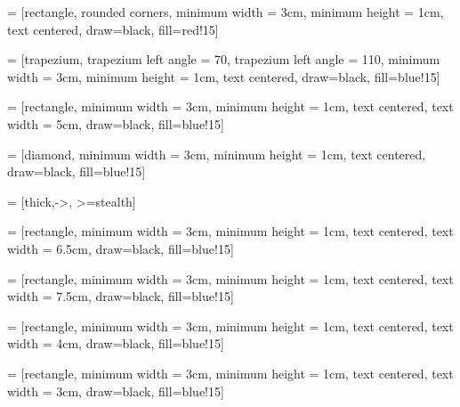 \RequirePackage{tikz}

 =
[rectangle, rounded corners, minimum width = 3cm, minimum height = 1cm,
text centered, draw=black, fill=red!15]

 = 
[trapezium, trapezium left angle = 70, trapezium left angle = 110, 
minimum width = 3cm, minimum height = 1cm, text centered, draw=black, 
fill=blue!15]

 =
[rectangle, minimum width = 3cm, minimum height = 1cm, text centered, 
text width = 5cm, draw=black, fill=blue!15]

 =
[diamond, minimum width = 3cm, minimum height = 1cm, text centered, draw=black,
fill=blue!15]

 = [thick,->, >=stealth]

 = 
[rectangle, minimum width = 3cm, minimum height = 1cm, text centered,
 text width = 6.5cm, draw=black, fill=blue!15]

 = [rectangle, minimum width = 3cm, minimum height = 1cm, 
text centered, text width = 7.5cm, draw=black, fill=blue!15]

 = [rectangle, minimum width = 3cm, minimum height = 1cm, 
text centered, text width = 4cm, draw=black, fill=blue!15]

 = [rectangle, minimum width = 3cm, minimum height = 1cm, 
text centered, text width = 3cm, draw=black, fill=blue!15]